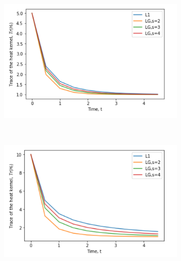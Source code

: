 \documentclass[10pt,a4paper]{article}
\begin{document}
		\begin{figure}[H]
			\centering
			\begin{subfigure}[b]{0.45\textwidth}
				\includegraphics[width= \textwidth]{images/model-1-mellin.png}
				\caption{}
				\label{model1-mellin}
			\end{subfigure}~
			\begin{subfigure}[b]{0.45\textwidth}
				\includegraphics[width= \textwidth]{images/model-2-mellin.png}
				\caption{}
				\label{model2-mellin}
			\end{subfigure} 
		\end{figure}
\end{document}
